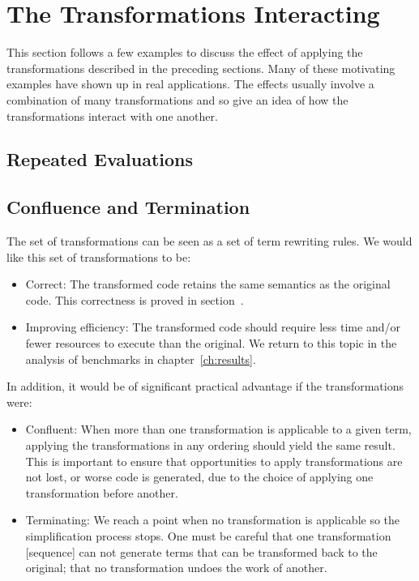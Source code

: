 \section{The Transformations Interacting}

This section follows a few examples to discuss the effect of applying the
transformations described in the preceding sections. Many of these motivating
examples have shown up in real applications. The effects usually involve a
combination of many transformations and so give an idea of how the
transformations interact with one another.

\subsection{Repeated Evaluations}
\subsection{Confluence and Termination}

The set of transformations can be seen as a set of term rewriting rules. We
would like this set of transformations to be:
%
\begin{itemize}
    \item Correct: The transformed code retains the same semantics as the
        original code. This correctness is proved in
        section~\derp.

    \item Improving efficiency: The transformed code should require less time
        and/or fewer resources to execute than the original. We return to this
        topic in the analysis of benchmarks in chapter~\ref{ch:results}.
\end{itemize}
%
In addition, it would be of significant practical advantage if the
transformations were:
%
\begin{itemize}
    \item Confluent: When more than one transformation is applicable to a given
        term, applying the transformations in any ordering should yield the same
        result. This is important to ensure that opportunities to apply
        transformations are not lost, or worse code is generated, due to
        the choice of applying one transformation before another.

    \item Terminating: We reach a point when no transformation is applicable so
        the simplification process stops. One must be careful that one
        transformation [sequence] can not generate terms that can be transformed
        back to the original; that no transformation undoes the work of another.
\end{itemize}

